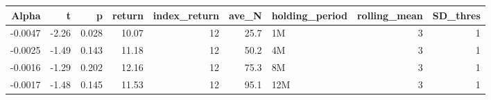 \begin{table}[ht]
\centering
\begin{tabular}{rrrrrrlrr}
  \hline
Alpha & t & p & return & index\_return & ave\_N & holding\_period & rolling\_mean & SD\_thres \\ 
  \hline
-0.0047 & -2.26 & 0.028 & 10.07 & 12 & 25.7 & 1M &  3 &  1 \\ 
  -0.0025 & -1.49 & 0.143 & 11.18 & 12 & 50.2 & 4M &  3 &  1 \\ 
  -0.0016 & -1.29 & 0.202 & 12.16 & 12 & 75.3 & 8M &  3 &  1 \\ 
  -0.0017 & -1.48 & 0.145 & 11.53 & 12 & 95.1 & 12M &  3 &  1 \\ 
   \hline
\end{tabular}
\end{table}

